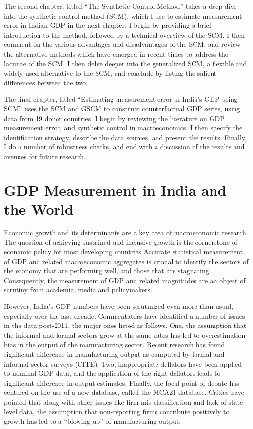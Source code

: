 \documentclass[12pt,nobind, a4paper]{reedthesis}
\begin{document}
 The second chapter, titled ``The Synthetic Control Method'' takes a deep dive into the synthetic control method (SCM), which I use to estimate measurement error in Indian GDP in the next chapter. I begin by providing a brief introduction to the method, followed by a technical overview of the SCM. I then comment on the various advantages and disadvantages of the SCM, and review the alternative methods which have emerged in recent times to address the lacunae of the SCM. I then delve deeper into the generalized SCM, a flexible and widely used alternative to the SCM, and conclude by listing the salient differences between the two.
 \linebreak

 The final chapter, titled ``Estimating measurement error in India's GDP using SCM'' uses the SCM and GSCM to construct counterfactual GDP series, using data from 19 donor countries. I begin by reviewing the literature on GDP measurement error, and synthetic control in macroeconomics. I then specify the identification strategy, describe the data sources, and present the results. Finally, I do a number of robustness checks, and end with a discussion of the results and avenues for future research.

 \hypertarget{gdp-measurement-in-india-and-the-world}{%
 \chapter{GDP Measurement in India and the World}\label{gdp-measurement-in-india-and-the-world}}

 Economic growth and its determinants are a key area of macroeconomic research. The question of achieving sustained and inclusive growth is the cornerstone of economic policy for most developing countries Accurate statistical measurement of GDP and related macroeconomic aggregates is crucial to identify the sectors of the economy that are performing well, and those that are stagnating. Consequently, the measurement of GDP and related magnitudes are an object of scrutiny from academia, media and policymakers.
 \linebreak

 However, India's GDP numbers have been scrutinized even more than usual, especially over the last decade. Commentators have identified a number of issues in the data post-2011, the major ones listed as follows. One, the assumption that the informal and formal sectors grow at the same rates has led to overestimation bias in the output of the manufacturing sector. Recent research has found significant difference in manufacturing output as computed by formal and informal sector surveys (CITE). Two, inappropriate deflators have been applied to nominal GDP data, and the application of the right deflators leads to significant difference in output estimates. Finally, the focal point of debate has centered on the use of a new database, called the MCA21 database. Critics have pointed that along with other issues like firm mis-classification and lack of state-level data, the assumption that non-reporting firms contribute positively to growth has led to a ``blowing up'' of manufacturing output.
 \linebreak
\end{document}

